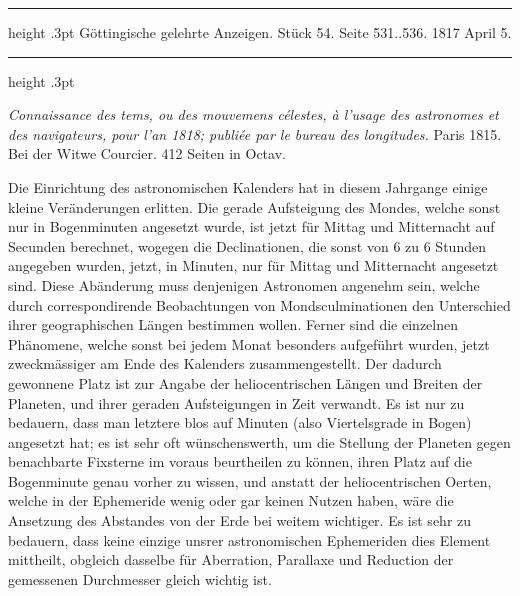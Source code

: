\par\bigskip
\hypertarget{native-600-lower}{}

\begin{center}
\parbox{.76\linewidth}{%
\centering\small
\hrule height .3pt\relax\vspace{2.5pt}
Göttingische gelehrte Anzeigen. Stück 54. Seite 531..536. 1817 April 5.\par
\vspace{2.5pt}\hrule height .3pt\relax
}
\end{center}

\emph{Connaissance des tems, ou des mouvemens célestes, à l'usage des astronomes et des navigateurs, pour l'an \textup{1818}; publiée par le bureau des longitudes.} Paris 1815. Bei der Witwe Courcier. 412 Seiten in Octav.

Die Einrichtung des astronomischen Kalenders hat in diesem Jahrgange einige kleine Veränderungen erlitten. Die gerade Aufsteigung des Mondes, welche sonst nur in Bogenminuten angesetzt wurde, ist jetzt für Mittag und Mitternacht auf Secunden berechnet, wogegen die Declinationen, die sonst von 6 zu 6 Stunden angegeben wurden, jetzt, in Minuten, nur für Mittag und Mitternacht angesetzt sind. Diese Abänderung muss denjenigen Astronomen angenehm sein, welche durch correspondirende Beobachtungen von Mondsculminationen den Unterschied ihrer geographischen Längen bestimmen wollen. Ferner sind die einzelnen Phänomene, welche sonst bei jedem Monat besonders aufgeführt wurden, jetzt zweckmässiger am Ende des Kalenders zusammengestellt. Der dadurch gewonnene Platz ist zur Angabe der heliocentrischen Längen und Breiten der Planeten, und ihrer geraden Aufsteigungen in Zeit verwandt. Es ist nur zu bedauern, dass man letztere blos auf Minuten (also Viertelsgrade in Bogen) angesetzt hat; es ist sehr oft wünschenswerth, um die Stellung der Planeten gegen benachbarte Fixsterne im voraus beurtheilen zu können, ihren Platz auf die Bogenminute genau vorher zu wissen, und anstatt der heliocentrischen Oerten, welche in der Ephemeride wenig oder gar keinen Nutzen haben, wäre die Ansetzung des Abstandes von der Erde bei weitem wichtiger. Es ist sehr zu bedauern, dass keine einzige unsrer astronomischen Ephemeriden dies Element mittheilt, obgleich dasselbe für Aberration, Parallaxe und Reduction der gemessenen Durchmesser gleich wichtig ist.

